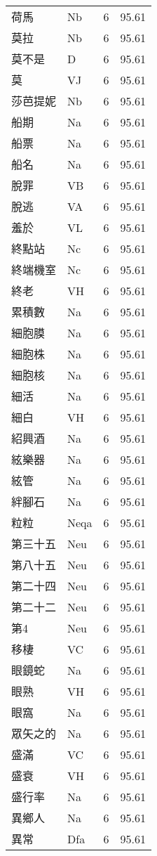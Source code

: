 \documentclass[twocolumn]{book}
\begin{document}
\begin{supertabular}{llrr}
荷馬 & Nb & 6 &  95.61\\
莫拉 & Nb & 6 &  95.61\\
莫不是 & D & 6 &  95.61\\
莫 & VJ & 6 &  95.61\\
莎芭提妮 & Nb & 6 &  95.61\\
船期 & Na & 6 &  95.61\\
船票 & Na & 6 &  95.61\\
船名 & Na & 6 &  95.61\\
脫罪 & VB & 6 &  95.61\\
脫逃 & VA & 6 &  95.61\\
羞於 & VL & 6 &  95.61\\
終點站 & Nc & 6 &  95.61\\
終端機室 & Nc & 6 &  95.61\\
終老 & VH & 6 &  95.61\\
累積數 & Na & 6 &  95.61\\
細胞膜 & Na & 6 &  95.61\\
細胞株 & Na & 6 &  95.61\\
細胞核 & Na & 6 &  95.61\\
細活 & Na & 6 &  95.61\\
細白 & VH & 6 &  95.61\\
紹興酒 & Na & 6 &  95.61\\
絃樂器 & Na & 6 &  95.61\\
絃管 & Na & 6 &  95.61\\
絆腳石 & Na & 6 &  95.61\\
粒粒 & Neqa & 6 &  95.61\\
第三十五 & Neu & 6 &  95.61\\
第八十五 & Neu & 6 &  95.61\\
第二十四 & Neu & 6 &  95.61\\
第二十二 & Neu & 6 &  95.61\\
第4 & Neu & 6 &  95.61\\
移棲 & VC & 6 &  95.61\\
眼鏡蛇 & Na & 6 &  95.61\\
眼熟 & VH & 6 &  95.61\\
眼窩 & Na & 6 &  95.61\\
眾矢之的 & Na & 6 &  95.61\\
盛滿 & VC & 6 &  95.61\\
盛衰 & VH & 6 &  95.61\\
盛行率 & Na & 6 &  95.61\\
異鄉人 & Na & 6 &  95.61\\
異常 & Dfa & 6 &  95.61\\

\end{supertabular}
\end{document}

